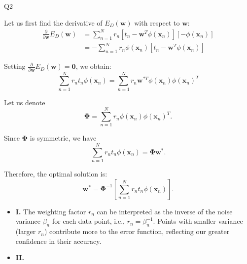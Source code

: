 \question Q2\droppoints

\begin{solution}
     Let us first find the derivative of $E_D(\mathbf{w})$ with respect to $\mathbf{w}$:
    \begin{align*}
        \frac{\partial}{\partial \mathbf{w}} E_D(\mathbf{w})
        &= \sum_{n = 1}^{N} r_n \left[ t_n - \mathbf{w}^T\phi(\mathbf{x}_n) \right] \left[ -\phi(\mathbf{x}_n) \right] \\[0.5em]
        &= -\sum_{n = 1}^{N} r_n \phi(\mathbf{x}_n) \left[ t_n - \mathbf{w}^T\phi(\mathbf{x}_n) \right]
    \end{align*}

    Setting $\frac{\partial}{\partial \mathbf{w}}E_D(\mathbf{w}) = \mathbf{0}$, we obtain:
    \[
        \sum_{n = 1}^{N} r_n t_n \phi(\mathbf{x}_n)
        = \sum_{n = 1}^{N} r_n \mathbf{w}^{*T} \phi(\mathbf{x}_n) \phi(\mathbf{x}_n)^T
    \]

    Let us denote
    \[
        \bm{\Phi} = \sum_{n = 1}^{N} r_n \phi(\mathbf{x}_n) \phi(\mathbf{x}_n)^T.
    \]

    Since $\bm{\Phi}$ is symmetric, we have
    \[
        \sum_{n = 1}^{N} r_n t_n \phi(\mathbf{x}_n) = \bm{\Phi} \mathbf{w}^*.
    \]

    Therefore, the optimal solution is:
    \[
        \mathbf{w}^* = \bm{\Phi}^{-1} \left[ \sum_{n = 1}^{N} r_n t_n \phi(\mathbf{x}_n) \right].
    \]

    \begin{itemize}
        \item { \textbf{I.}
        The weighting factor $r_n$ can be interpreted as the inverse of the noise variance $\beta_n$ for each data point, i.e., $r_n = \beta_n^{-1}$.
        Points with smaller variance (larger $r_n$) contribute more to the error function, reflecting our greater confidence in their accuracy.
        }
        \item { \textbf{II.} }
    \end{itemize}
\end{solution}